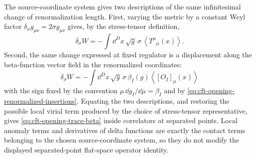 The source-coordinate system gives two descriptions of the same infinitesimal change of
renormalization length.  First, varying the metric by a constant Weyl factor
\(\delta_\sigma g_{\mu\nu}=2\sigma g_{\mu\nu}\) gives, by the stress-tensor
definition,
\[
  \delta_\sigma W
  =
  -\int\dd^D x\,\sqrt g\,\sigma\,
  \left\langle T^\mu{}_\mu(x)\right\rangle .
\]
Second, the same change expressed at fixed regulator is a displacement along
the beta-function vector field in the renormalized coordinates:
\[
  \delta_\sigma W
  =
  -\int\dd^D x\,\sqrt g\,\sigma\,
  \beta_I(g)\left\langle [O_I]_\mu(x)\right\rangle
  \]
with the sign fixed by the convention
\(\mu\,\dd g_I/\dd\mu=\beta_I\) and by
\eqref{eq:cft-opening-renormalized-insertions}.  Equating the two
descriptions, and restoring the possible local virial term produced by the
choice of stress-tensor representative, gives
\eqref{eq:cft-opening-trace-beta} inside correlators at separated points.
Local anomaly terms and derivatives of delta functions are exactly the contact
terms belonging to the chosen source-coordinate system, so they do not modify the
displayed separated-point flat-space operator identity.

